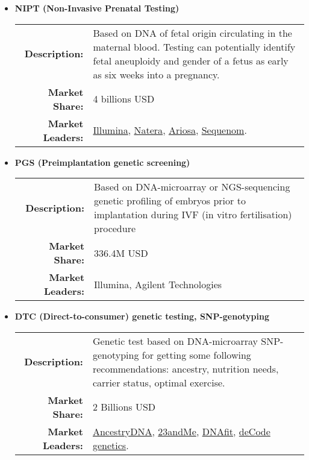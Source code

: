 \begin{itemize}

\item \textbf{NIPT (Non-Invasive Prenatal Testing)} \newline
\begin{tabular}{r|p{11cm}} \hline
    \small\textbf{Description:}    & \small Based on DNA of fetal origin circulating in the maternal blood. Testing can potentially identify fetal aneuploidy\cite{Fan21102008} and gender of a fetus as early as six weeks into a pregnancy.\\
    \small\textbf{Market Share:}   & \small 4 billions USD  \\
    \small\textbf{Market Leaders:} & \small
     \href{https://www.illumina.com/}{Illumina},
     \href{http://www.natera.com/}{Natera},
     \href{http://www.ariosadx.com/}{Ariosa},
     \href{https://www.sequenom.com/}{Sequenom}.\\
\end{tabular}


  \item \textbf{PGS (Preimplantation genetic screening)} \newline
  \begin{tabular}{r|p{11cm}} \hline
    \small\textbf{Description:}    & \small Based on DNA-microarray or NGS-sequencing genetic profiling of embryos prior to implantation during IVF (in vitro fertilisation) procedure \\
    \small\textbf{Market Share:}   & \small 336.4M USD \\
    \small\textbf{Market Leaders:} & \small Illumina, Agilent Technologies
  \end{tabular}

  \item \textbf{DTC (Direct-to-consumer) genetic testing, SNP-genotyping} \newline
  \begin{tabular}{r|p{11cm}} \hline
    \small\textbf{Description:}    & \small Genetic test based on DNA-microarray SNP-genotyping for getting some following recommendations: ancestry, nutrition needs, carrier status, optimal exercise.
 \\
    \small\textbf{Market Share:}   & \small 2 Billions USD \\
    \small\textbf{Market Leaders:} & \small
      \href{https://www.ancestry.com/dna/}{AncestryDNA},
      \href{https://www.23andme.com/}{23andMe},
      \href{https://www.dnafit.com/}{DNAfit},
      \href{https://www.decode.com/}{deCode genetics}.
  \end{tabular}


\end{itemize}
